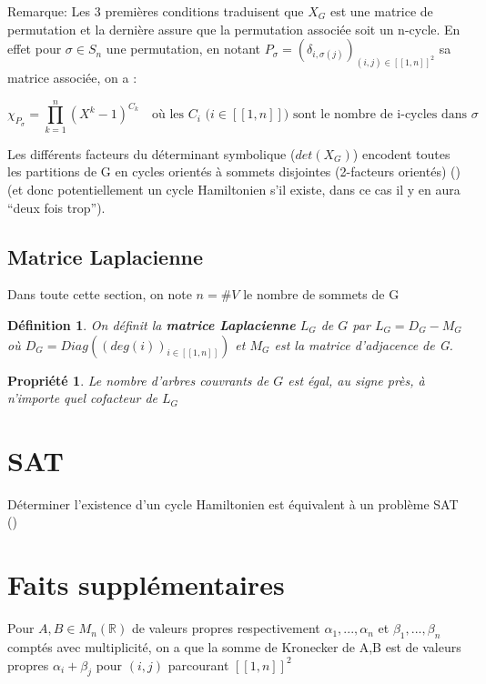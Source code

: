\documentclass{article}
\newtheorem{definition}{Définition}[section]
\newtheorem{property}{Propriété}[section]
\begin{document}
Remarque: Les 3 premières conditions traduisent que $X_{G}$ est une matrice de permutation et la dernière assure que la permutation associée soit un n-cycle. En effet pour $\sigma \in S_{n}$ une permutation, en notant $P_{\sigma}=(\delta_{i,\sigma (j)})_{(i,j)\in [\![1,n]\!]^{2}}$ sa matrice associée, on a :

\[
\chi_{P_{\sigma}}=\prod\limits_{k=1}^{n}(X^{k}-1)^{C_{k}} \quad \text{où les $C_{i}$ ($i \in [\![1,n]\!]$) sont le nombre de i-cycles dans $\sigma$}
\]




Les différents facteurs du déterminant symbolique ($det(X_{G})$) encodent toutes les partitions de G en cycles orientés à sommets disjointes (2-facteurs orientés) (\cite{Ejov2006SOLVINGTH}) (et donc potentiellement un cycle Hamiltonien s'il existe, dans ce cas il y en aura ``deux fois trop'').

\subsection{Matrice Laplacienne}
Dans toute cette section, on note $n=\# V$ le nombre de sommets de G

\begin{definition}
On définit la \textbf{matrice Laplacienne} $L_{G}$ de $G$ par $L_{G}=D_{G}-M_{G}$ où $D_{G}=Diag((deg(i))_{i \in [\! [1,n]\! ]})$ et $M_{G}$ est la matrice d'adjacence de G.
\end{definition}

\begin{property}
Le nombre d'arbres couvrants de $G$ est égal, au signe près, à n'importe quel cofacteur de $L_{G}$
\end{property}



\section{SAT}
Déterminer l'existence d'un cycle Hamiltonien est équivalent à un problème SAT (\cite{Plotnikov2001ALM})

\section{Faits supplémentaires}
Pour $A,B \in M_{n}(\mathbb{R})$ de valeurs propres respectivement $\alpha_{1},...,\alpha_{n}$ et $\beta_{1},...,\beta_{n}$ comptés avec multiplicité, on a que la somme de Kronecker de A,B est de valeurs propres $\alpha_{i}+\beta_{j}$ pour $(i,j)$ parcourant $[\![1,n]\!]^2$
\end{document}
